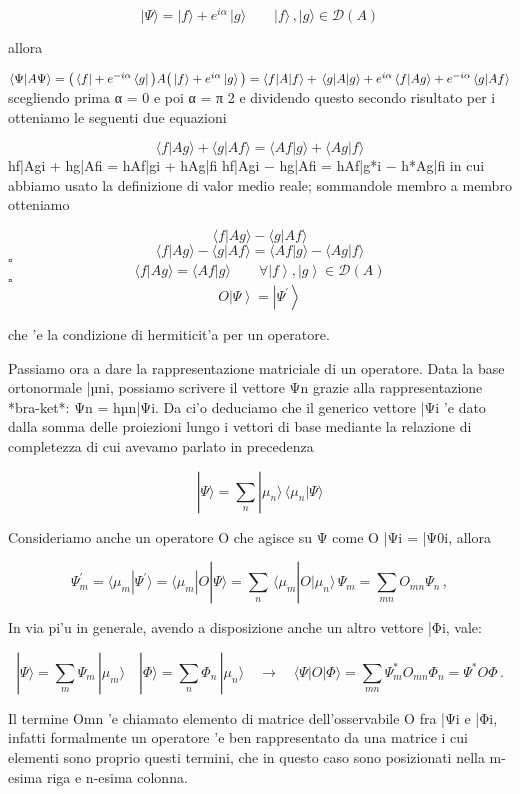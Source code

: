 $$|\Psi\rangle=|f\rangle+e^{i\alpha}\,|g\rangle\qquad|f\rangle\,,|g\rangle\in{\mathcal{D}}(A)$$

allora

$\langle\Psi|A\Psi\rangle=\big{(}\,\langle f|+e^{-i\alpha}\,\langle g|\,\big{)}A\big{(}\,|f\rangle+e^{i\alpha}\,|g\rangle\,\big{)}=\langle f|A|f\rangle+\,\langle g|A|g\rangle+e^{i\alpha}\,\langle f|Ag\rangle+e^{-i\alpha}\,\langle g|Af\rangle$
scegliendo prima α = 0 e poi α =
π 2 e dividendo questo secondo risultato per i otteniamo le seguenti due equazioni

$$\langle f|A g\rangle+\langle g|A f\rangle=\langle A f|g\rangle+\langle A g|f\rangle$$
hf|Agi + hg|Afi = hAf|gi + hAg|fi hf|Agi − hg|Afi = hAf|g*i − h*Ag|fi
in cui abbiamo usato la definizione di valor medio reale; sommandole membro a membro otteniamo

$$\langle f|A g\rangle-\langle g|A f\rangle$$
$$\langle f|A g\rangle-\langle g|A f\rangle=\langle A f|g\rangle-\langle A g|f\rangle$$
$\square$
$$\langle f|A g\rangle=\langle A f|g\rangle\qquad\forall\left|f\right\rangle,\left|g\right\rangle\in{\mathcal{D}}(A)$$
$\square$
$$O\left|\Psi\right\rangle=\left|\Psi^{\prime}\right\rangle$$

che 'e la condizione di hermiticit'a per un operatore.

Passiamo ora a dare la rappresentazione matriciale di un operatore. Data la base ortonormale {|µni}, possiamo scrivere il vettore Ψn grazie alla rappresentazione *bra-ket*: Ψn = hµn|Ψi. Da ci'o deduciamo che il generico vettore |Ψi 'e dato dalla somma delle proiezioni lungo i vettori di base mediante la relazione di completezza di cui avevamo parlato in precedenza

$$|\Psi\rangle=\sum_{n}|\mu_{n}\rangle\,\langle\mu_{n}|\Psi\rangle$$

Consideriamo anche un operatore O che agisce su Ψ come O |Ψi = |Ψ0i, allora

$$\Psi_{m}^{\prime}=\langle\mu_{m}|\Psi^{\prime}\rangle=\langle\mu_{m}|O|\Psi\rangle=\sum_{n}\,\langle\mu_{m}|O|\mu_{n}\rangle\,\Psi_{m}=\sum_{m n}O_{m n}\Psi_{n}\,,$$

In via pi'u in generale, avendo a disposizione anche un altro vettore |Φi, vale:

$$|\Psi\rangle=\sum_{m}\Psi_{m}\,|\mu_{m}\rangle\quad|\Phi\rangle=\sum_{n}\Phi_{n}\,|\mu_{n}\rangle\quad\longrightarrow\quad\langle\Psi|O|\Phi\rangle=\sum_{m n}\Psi_{m}^{*}O_{m n}\Phi_{n}=\Psi^{*}O\Phi\,.$$

Il termine Omn 'e chiamato elemento di matrice dell'osservabile O fra |Ψi e |Φi, infatti formalmente un operatore
'e ben rappresentato da una matrice i cui elementi sono proprio questi termini, che in questo caso sono posizionati nella m-esima riga e n-esima colonna.

